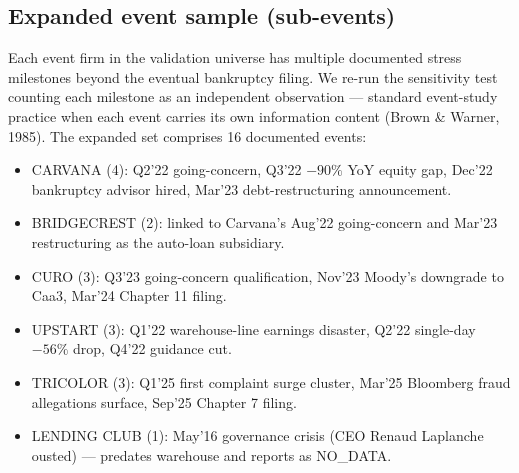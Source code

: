 \documentclass[11pt,a4paper]{article}
\begin{document}
\subsection{Expanded event sample (sub-events)}\label{sec:results_expanded}

Each event firm in the validation universe has multiple documented stress milestones beyond the eventual bankruptcy filing. We re-run the sensitivity test counting each milestone as an independent observation --- standard event-study practice when each event carries its own information content (Brown \& Warner, 1985). The expanded set comprises 16 documented events:

\begin{itemize}[leftmargin=*]
\item CARVANA (4): Q2'22 going-concern, Q3'22 $-90\%$ YoY equity gap, Dec'22 bankruptcy advisor hired, Mar'23 debt-restructuring announcement.
\item BRIDGECREST (2): linked to Carvana's Aug'22 going-concern and Mar'23 restructuring as the auto-loan subsidiary.
\item CURO (3): Q3'23 going-concern qualification, Nov'23 Moody's downgrade to Caa3, Mar'24 Chapter 11 filing.
\item UPSTART (3): Q1'22 warehouse-line earnings disaster, Q2'22 single-day $-56\%$ drop, Q4'22 guidance cut.
\item TRICOLOR (3): Q1'25 first complaint surge cluster, Mar'25 Bloomberg fraud allegations surface, Sep'25 Chapter 7 filing.
\item LENDING CLUB (1): May'16 governance crisis (CEO Renaud Laplanche ousted) --- predates warehouse and reports as NO\_DATA.
\end{itemize}

\begin{table}[h]
\centering\small
{}
\caption{Sensitivity tightening from sub-event expansion. The expanded sample of 16 candidate events includes one no-data observation (Lending Club's 2016 crisis predates the warehouse start of 2019); the 15 events with sufficient pre-event data are all detected at every threshold from $1.5\sigma$ to $3.0\sigma$. CI width reduction: 62\%. Source: \texttt{empirics\_v2/out/v2/sensitivity\_wilson\_ci\_expanded.csv}.}\label{tab:sens_expanded}
\end{table}
\end{document}
